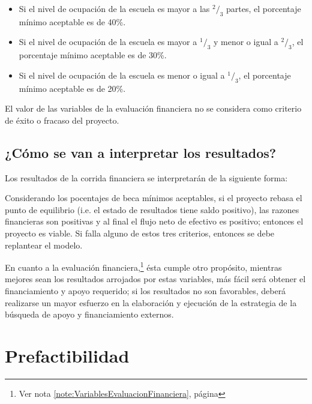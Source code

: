 \begin{itemize}
	\item Si el nivel de ocupación de la escuela es mayor a las $^2/_3$ partes, el porcentaje mínimo aceptable es de 40\%.
	\item Si el nivel de ocupación de la escuela es mayor a $^1/_3$ y menor o igual a $^2/_3$, el porcentaje mínimo aceptable es de 30\%.
	\item Si el nivel de ocupación de la escuela es menor o igual a $^1/_3$, el porcentaje mínimo aceptable es de 20\%.
\end{itemize}

El valor de las variables de la evaluación financiera no se considera como criterio de éxito o fracaso del proyecto.


\subsection{¿Cómo se van a interpretar los resultados?}

Los resultados de la corrida financiera se interpretarán de la siguiente forma:

Considerando los pocentajes de beca mínimos aceptables, si el proyecto rebasa el punto de equilibrio (i.e. el estado de resultados tiene saldo positivo), las razones financieras son positivas y al final el flujo neto de efectivo es positivo; entonces el proyecto es viable. Si falla alguno de estos tres criterios, entonces se debe replantear el modelo.

En cuanto a la evaluación financiera,\footnote{Ver nota \ref{note:VariablesEvaluacionFinanciera}, página \pageref{note:VariablesEvaluacionFinanciera}} ésta cumple otro propósito, mientras mejores sean los resultados arrojados por estas variables, más fácil será obtener el financiamiento y apoyo requerido; si los resultados no son favorables, deberá realizarse un mayor esfuerzo en la elaboración y ejecución de la estrategia de la búsqueda de apoyo y financiamiento externos.

\section{Prefactibilidad}

